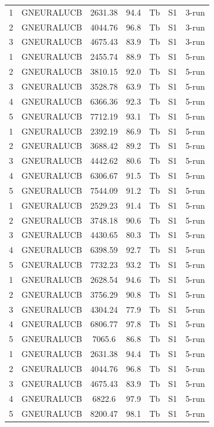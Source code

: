 \documentclass[11pt]{article}
\begin{document}
\begin{center}
\begin{longtable}{|c|c|c|c|c|c|c|}
1 & GNEURALUCB & 2631.38 & 94.4 & Tb & S1 & 3-run \\
2 & GNEURALUCB & 4044.76 & 96.8 & Tb & S1 & 3-run \\
3 & GNEURALUCB & 4675.43 & 83.9 & Tb & S1 & 3-run \\
1 & GNEURALUCB & 2455.74 & 88.9 & Tb & S1 & 5-run \\
2 & GNEURALUCB & 3810.15 & 92.0 & Tb & S1 & 5-run \\
3 & GNEURALUCB & 3528.78 & 63.9 & Tb & S1 & 5-run \\
4 & GNEURALUCB & 6366.36 & 92.3 & Tb & S1 & 5-run \\
5 & GNEURALUCB & 7712.19 & 93.1 & Tb & S1 & 5-run \\
1 & GNEURALUCB & 2392.19 & 86.9 & Tb & S1 & 5-run \\
2 & GNEURALUCB & 3688.42 & 89.2 & Tb & S1 & 5-run \\
3 & GNEURALUCB & 4442.62 & 80.6 & Tb & S1 & 5-run \\
4 & GNEURALUCB & 6306.67 & 91.5 & Tb & S1 & 5-run \\
5 & GNEURALUCB & 7544.09 & 91.2 & Tb & S1 & 5-run \\
1 & GNEURALUCB & 2529.23 & 91.4 & Tb & S1 & 5-run \\
2 & GNEURALUCB & 3748.18 & 90.6 & Tb & S1 & 5-run \\
3 & GNEURALUCB & 4430.65 & 80.3 & Tb & S1 & 5-run \\
4 & GNEURALUCB & 6398.59 & 92.7 & Tb & S1 & 5-run \\
5 & GNEURALUCB & 7732.23 & 93.2 & Tb & S1 & 5-run \\
1 & GNEURALUCB & 2628.54 & 94.6 & Tb & S1 & 5-run \\
2 & GNEURALUCB & 3756.29 & 90.8 & Tb & S1 & 5-run \\
3 & GNEURALUCB & 4304.24 & 77.9 & Tb & S1 & 5-run \\
4 & GNEURALUCB & 6806.77 & 97.8 & Tb & S1 & 5-run \\
5 & GNEURALUCB & 7065.6 & 86.8 & Tb & S1 & 5-run \\
1 & GNEURALUCB & 2631.38 & 94.4 & Tb & S1 & 5-run \\
2 & GNEURALUCB & 4044.76 & 96.8 & Tb & S1 & 5-run \\
3 & GNEURALUCB & 4675.43 & 83.9 & Tb & S1 & 5-run \\
4 & GNEURALUCB & 6822.6 & 97.9 & Tb & S1 & 5-run \\
5 & GNEURALUCB & 8200.47 & 98.1 & Tb & S1 & 5-run \\

\end{longtable}
\end{center}
\end{document}
